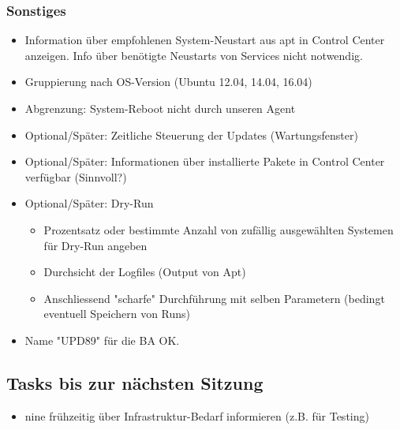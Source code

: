 \documentclass[class=scrbook,crop=false]{standalone}
\begin{document}
    \subsubsection{Sonstiges}
    
    \begin{itemize}
        \item Information über empfohlenen System-Neustart aus apt in Control Center anzeigen. Info über benötigte Neustarts von Services nicht notwendig.
        \item Gruppierung nach OS-Version (Ubuntu 12.04, 14.04, 16.04)
        \item Abgrenzung: System-Reboot nicht durch unseren Agent
        \item Optional/Später: Zeitliche Steuerung der Updates (Wartungsfenster)
        \item Optional/Später: Informationen über installierte Pakete in Control Center verfügbar (Sinnvoll?)
        \item Optional/Später: Dry-Run
        \begin{itemize}
            \item Prozentsatz oder bestimmte Anzahl von zufällig ausgewählten Systemen für Dry-Run angeben
            \item Durchsicht der Logfiles (Output von Apt)
            \item Anschliessend "scharfe" Durchführung mit selben Parametern (bedingt eventuell Speichern von Runs)
        \end{itemize}
        \item Name "UPD89" für die BA OK.
    \end{itemize}
    
    \subsection*{Tasks bis zur nächsten Sitzung}
    
    \begin{itemize}
        \item \gls{nine} frühzeitig über Infrastruktur-Bedarf informieren (z.B. für Testing)
    \end{itemize}
\end{document}
